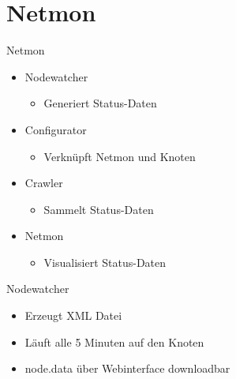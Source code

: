 \section{Netmon}


\begin{frame}{Netmon}
    \begin{itemize}
        \item Nodewatcher
        \begin{itemize}
            \item Generiert Status-Daten
        \end{itemize}
        \item Configurator
        \begin{itemize}
            \item Verknüpft Netmon und Knoten
        \end{itemize}
        \item Crawler
        \begin{itemize}
            \item Sammelt Status-Daten
        \end{itemize}
        \item Netmon
        \begin{itemize}
            \item Visualisiert Status-Daten
        \end{itemize}
    \end{itemize}
\end{frame}

\begin{frame}{Nodewatcher}
    \begin{itemize}
        \item Erzeugt XML Datei
        \item Läuft alle 5 Minuten auf den Knoten
        \item node.data über Webinterface downloadbar
    \end{itemize}
\end{frame}

